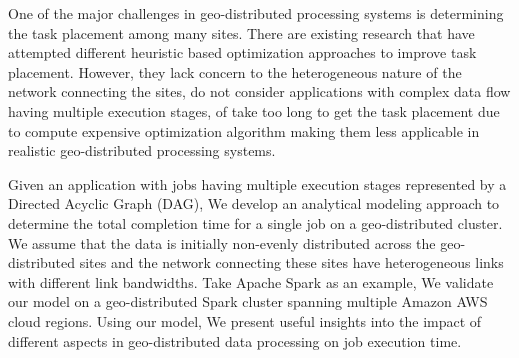 \documentclass[base.tex]{subfiles}
\begin{document}

One of the major challenges in geo-distributed processing systems is determining the task placement among many sites. There are existing research that have attempted different heuristic based optimization approaches to improve task placement. However, they lack concern to the heterogeneous nature of the network connecting the sites, do not consider applications with complex data flow having multiple execution stages, of take too long to get the task placement due to compute expensive optimization algorithm making them less applicable in realistic geo-distributed processing systems. 

Given an application with jobs having multiple execution stages represented by a Directed Acyclic Graph (DAG), We develop an analytical modeling approach to determine the total completion time for a single job on a geo-distributed cluster. We assume that the data is initially non-evenly distributed across the geo-distributed sites and the network connecting these sites have heterogeneous links with different link bandwidths. Take Apache Spark as an example, We validate our model on a geo-distributed Spark cluster spanning multiple Amazon AWS cloud regions. Using our model, We present useful insights into the impact of different aspects in geo-distributed data processing on job execution time.
\end{document}
